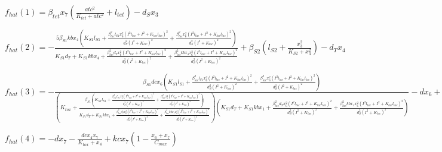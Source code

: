 $f_{hat}(1)=\beta_{tet} x_{7} \left(\frac{atc^{2}}{K_{tet} + atc^{2}} + l_{tet}\right) - d_{S} x_{3}$


$f_{hat}(2)=- \frac{5 \beta_{S1} kb x_{4} \left(K_{S1} l_{S1} + \frac{\beta_{lac}^{2} l_{S1} x_{6}^{2} \left(I^{2} l_{lac} + I^{2} + K_{lac} l_{lac}\right)^{2}}{d_{S}^{2} \left(I^{2} + K_{lac}\right)^{2}} + \frac{\beta_{lac}^{2} x_{6}^{2} \left(I^{2} l_{lac} + I^{2} + K_{lac} l_{lac}\right)^{2}}{d_{S}^{2} \left(I^{2} + K_{lac}\right)^{2}}\right)}{K_{S1} d_{T} + K_{S1} kb x_{4} + \frac{\beta_{lac}^{2} d_{T} x_{6}^{2} \left(I^{2} l_{lac} + I^{2} + K_{lac} l_{lac}\right)^{2}}{d_{S}^{2} \left(I^{2} + K_{lac}\right)^{2}} + \frac{\beta_{lac}^{2} kb x_{4} x_{6}^{2} \left(I^{2} l_{lac} + I^{2} + K_{lac} l_{lac}\right)^{2}}{d_{S}^{2} \left(I^{2} + K_{lac}\right)^{2}}} + \beta_{S2} \left(l_{S2} + \frac{x_{3}^{2}}{K_{S2} + x_{3}^{2}}\right) - d_{T} x_{4}$


$f_{hat}(3)=- \frac{\beta_{S1} dc x_{6} \left(K_{S1} l_{S1} + \frac{\beta_{lac}^{2} l_{S1} x_{6}^{2} \left(I^{2} l_{lac} + I^{2} + K_{lac} l_{lac}\right)^{2}}{d_{S}^{2} \left(I^{2} + K_{lac}\right)^{2}} + \frac{\beta_{lac}^{2} x_{6}^{2} \left(I^{2} l_{lac} + I^{2} + K_{lac} l_{lac}\right)^{2}}{d_{S}^{2} \left(I^{2} + K_{lac}\right)^{2}}\right)}{\left(K_{tox} + \frac{\beta_{S1} \left(K_{S1} l_{S1} + \frac{\beta_{lac}^{2} l_{S1} x_{6}^{2} \left(I^{2} l_{lac} + I^{2} + K_{lac} l_{lac}\right)^{2}}{d_{S}^{2} \left(I^{2} + K_{lac}\right)^{2}} + \frac{\beta_{lac}^{2} x_{6}^{2} \left(I^{2} l_{lac} + I^{2} + K_{lac} l_{lac}\right)^{2}}{d_{S}^{2} \left(I^{2} + K_{lac}\right)^{2}}\right)}{K_{S1} d_{T} + K_{S1} kb x_{1} + \frac{\beta_{lac}^{2} d_{T} x_{6}^{2} \left(I^{2} l_{lac} + I^{2} + K_{lac} l_{lac}\right)^{2}}{d_{S}^{2} \left(I^{2} + K_{lac}\right)^{2}} + \frac{\beta_{lac}^{2} kb x_{1} x_{6}^{2} \left(I^{2} l_{lac} + I^{2} + K_{lac} l_{lac}\right)^{2}}{d_{S}^{2} \left(I^{2} + K_{lac}\right)^{2}}}\right) \left(K_{S1} d_{T} + K_{S1} kb x_{1} + \frac{\beta_{lac}^{2} d_{T} x_{6}^{2} \left(I^{2} l_{lac} + I^{2} + K_{lac} l_{lac}\right)^{2}}{d_{S}^{2} \left(I^{2} + K_{lac}\right)^{2}} + \frac{\beta_{lac}^{2} kb x_{1} x_{6}^{2} \left(I^{2} l_{lac} + I^{2} + K_{lac} l_{lac}\right)^{2}}{d_{S}^{2} \left(I^{2} + K_{lac}\right)^{2}}\right)} - d x_{6} + kc x_{6} \left(1 - \frac{x_{6} + x_{7}}{C_{max}}\right)$


$f_{hat}(4)=- d x_{7} - \frac{dc x_{4} x_{7}}{K_{tox} + x_{4}} + kc x_{7} \left(1 - \frac{x_{6} + x_{7}}{C_{max}}\right)$



